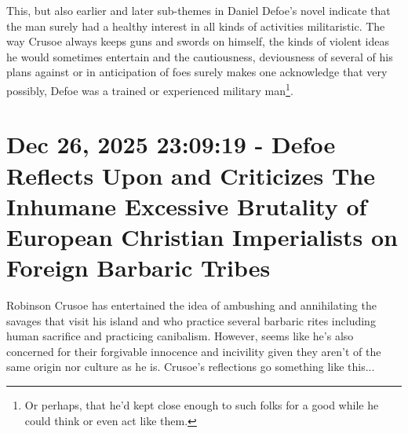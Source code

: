 \documentclass[a4paper]{article}
\begin{document}
This, but also earlier and later sub-themes in Daniel Defoe's novel indicate that the man surely had a healthy interest in all kinds of activities militaristic. The way Crusoe always keeps guns and swords on himself, the kinds of violent ideas he would sometimes entertain and the cautiousness, deviousness of several of his plans against or in anticipation of foes surely makes one acknowledge that very possibly, Defoe was a trained or experienced military man\footnote{Or perhaps, that he'd kept close enough to such folks for a good while he could think or even act like them.}.







\section{Dec 26, 2025 23:09:19 - Defoe Reflects Upon and Criticizes The Inhumane Excessive Brutality of European Christian Imperialists on Foreign Barbaric Tribes}
\label{SEC46}


Robinson Crusoe has entertained the idea of ambushing and annihilating the savages that visit his island and who practice several barbaric rites including human sacrifice and practicing canibalism. However, seems like he's also concerned for their forgivable innocence and incivility given they aren't of the same origin nor culture as he is. Crusoe's reflections go something like this...
\end{document}
